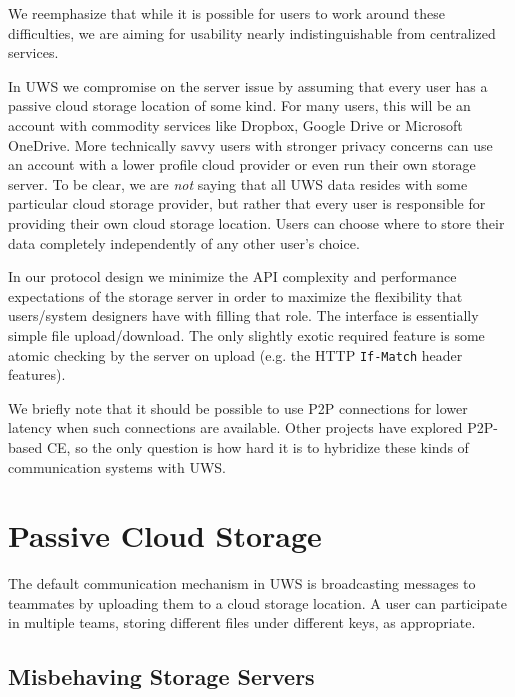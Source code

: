 \documentclass[runningheads]{llncs}
\begin{document}

We reemphasize that while it is possible for users to work around these difficulties, we are aiming for usability nearly indistinguishable from centralized services.

In UWS we compromise on the server issue by assuming that every user has a passive cloud storage location of some kind.
For many users, this will be an account with commodity services like Dropbox, Google Drive or Microsoft OneDrive.
More technically savvy users with stronger privacy concerns can use an account with a lower profile cloud provider or even run their own storage server.
To be clear, we are \emph{not} saying that all UWS data resides with some particular cloud storage provider, but rather that every user is responsible for providing their own cloud storage location.
Users can choose where to store their data completely independently of any other user's choice.

In our protocol design we minimize the API complexity and performance expectations of the storage server in order to maximize the flexibility that users{\slash}system designers have with filling that role.
The interface is essentially simple file upload{\slash}download.
The only slightly exotic required feature is some atomic checking by the server on upload (e.g. the HTTP \texttt{If-Match} header features).

We briefly note that it should be possible to use P2P connections for lower latency when such connections are available.
Other projects have explored P2P-based CE, so the only question is how hard it is to hybridize these kinds of communication systems with UWS.

\section{Passive Cloud Storage}

The default communication mechanism in UWS is broadcasting messages to teammates by uploading them to a cloud storage location.
A user can participate in multiple teams, storing different files under different keys, as appropriate.

\subsection{Misbehaving Storage Servers}
\end{document}
